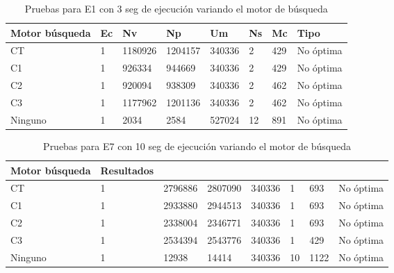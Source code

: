 \begin{center}
\begin{longtable}{|p{3cm}|p{1.0cm}|p{1.6cm}|p{1.6cm}|p{1.1cm}|p{1.1cm}|p{1.1cm}|p{2.7cm}|}
	\caption{Pruebas para E1 con 3 seg de ejecución variando el motor de búsqueda} \\
	\hline
	\cellcolor[gray]{0.9} \textbf{Motor búsqueda} & \cellcolor[gray]{0.9}\textbf{Ec} & \cellcolor[gray]{0.9}\textbf{Nv} & \cellcolor[gray]{0.9}\textbf{Np} & \cellcolor[gray]{0.9}\textbf{Um} & \cellcolor[gray]{0.9}\textbf{Ns} &  \cellcolor[gray]{0.9}\textbf{Mc} & \cellcolor[gray]{0.9}\textbf{Tipo}\\	\hline
	CT& 1 &1180926  &1204157 &340336  &2 &429&No óptima \\
	\hline
	C1& 1 &926334  &944669 &340336  &2 &429&No óptima \\
	\hline
	C2& 1 &920094  &938309 &340336  &2 &462&No óptima \\
	\hline
	C3& 1 &1177962  &1201136 &340336  &2 &462&No óptima \\
	\hline
	Ninguno& 1 &2034  &2584 &527024  &12 &891&No óptima \\
	\hline
\end{longtable}	
\end{center}

\begin{center}
\begin{longtable}{|p{3cm}|p{1.0cm}|p{1.6cm}|p{1.6cm}|p{1.1cm}|p{1.1cm}|p{1.1cm}|p{2.7cm}|}
	\caption{Pruebas para E7 con 10 seg de ejecución variando el motor de búsqueda} \\
	\hline
	\cellcolor[gray]{0.9} \textbf{Motor búsqueda} & \cellcolor[gray]{0.9}\textbf{Resultados} \\
	\hline
	CT& 1 &2796886  &2807090 &340336  &1 &693&No óptima \\
	\hline
	C1& 1 &2933880  &2944513 &340336  &1 &693&No óptima \\
	\hline
	C2& 1 &2338004  &2346771 &340336  &1 &693&No óptima \\
	\hline
	C3& 1 &2534394  &2543776 &340336  &1 &429&No óptima \\
	\hline
	Ninguno& 1 &12938  &14414 &340336  &10 &1122&No óptima \\
	\hline
\end{longtable}	
\end{center}


